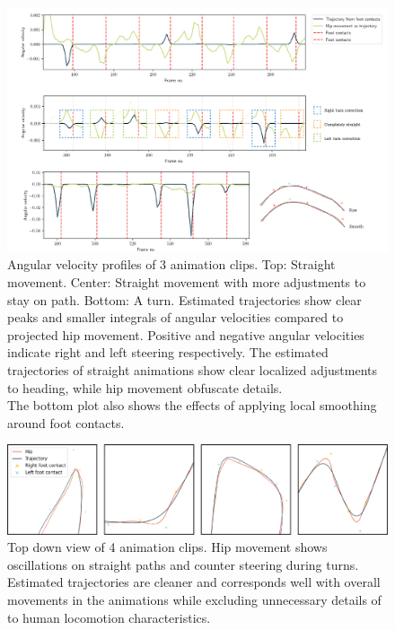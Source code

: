 \begin{figure}
    \centering
    \includegraphics[width=1.0\columnwidth]{img/estimated_trajectory_angular_velocity.png}
    \caption{Angular velocity profiles of 3 animation clips. Top: Straight movement. Center: Straight movement with more adjustments to stay on path. Bottom: A turn. Estimated trajectories show clear peaks and smaller integrals of angular velocities compared to projected hip movement. Positive and negative angular velocities indicate right and left steering respectively. The estimated trajectories of straight animations show clear localized adjustments to heading, while hip movement obfuscate details.\\The bottom plot also shows the effects of applying local smoothing around foot contacts.}
    \label{fig:results:estimatedtrajectory:stats}
\end{figure}
\begin{figure}
    \centering
    \includegraphics[width=1.0\linewidth]{img/estimated_trajectory_examples.png}
    \caption{Top down view of 4 animation clips. Hip movement shows oscillations on straight paths and counter steering during turns. Estimated trajectories are cleaner and corresponds well with overall movements in the animations while excluding unnecessary details of to human locomotion characteristics.}
    \label{fig:results:estimatedtrajectory:examples}
\end{figure}


